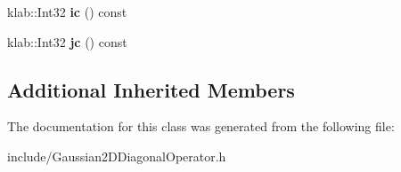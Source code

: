 \begin{DoxyCompactItemize}
\item 
klab\+::\+Int32 {\bfseries ic} () const \hypertarget{classkl1p_1_1TGaussian2DDiagonalOperator_a7579932430acc2f14bf0edf184d43415}{}\label{classkl1p_1_1TGaussian2DDiagonalOperator_a7579932430acc2f14bf0edf184d43415}

\item 
klab\+::\+Int32 {\bfseries jc} () const \hypertarget{classkl1p_1_1TGaussian2DDiagonalOperator_af4f85759c421d40fec1a8ae1bb6a30b6}{}\label{classkl1p_1_1TGaussian2DDiagonalOperator_af4f85759c421d40fec1a8ae1bb6a30b6}

\end{DoxyCompactItemize}
\subsection*{Additional Inherited Members}


The documentation for this class was generated from the following file\+:\begin{DoxyCompactItemize}
\item 
include/Gaussian2\+D\+Diagonal\+Operator.\+h\end{DoxyCompactItemize}
